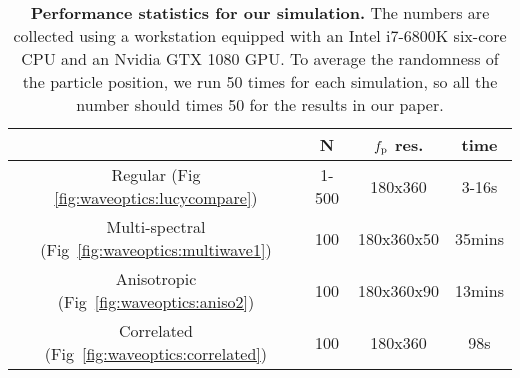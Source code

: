 \begin{table}[h]
	\centering
	\addtolength{\tabcolsep}{5pt}
    \caption[Performance statistics for our simulation]{\label{fig:waveoptics:time}
        \textbf{Performance statistics for our simulation.}
		The numbers are collected using a workstation equipped with an Intel i7-6800K six-core CPU and an Nvidia GTX 1080 GPU.
		To average the randomness of the particle position, we run 50 times for each simulation, so all the number should times 50 for the results in our paper.
    }
    \begin{tabular}{cccc}
                                                               & N     & $f_\mathrm{p}$ res.    & time   \\
    \hline
    Regular (Fig \ref{fig:waveoptics:lucycompare})             & 1-500 &  180x360         & 3-16s  \\
    Multi-spectral (Fig~\ref{fig:waveoptics:multiwave1})       & 100   &  180x360x50      & 35mins \\
    Anisotropic (Fig~\ref{fig:waveoptics:aniso2})              & 100   &  180x360x90      & 13mins \\
    Correlated (Fig~\ref{fig:waveoptics:correlated})           & 100   &  180x360         & 98s    \\
    \end{tabular}
\end{table}
